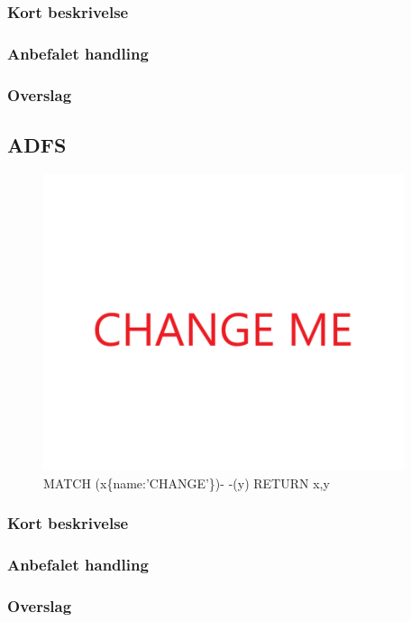 \documentclass{article}
\begin{document}
\subsubsection{Kort beskrivelse}
\subsubsection{Anbefalet handling}
\subsubsection{Overslag}


\subsection{ADFS}
\begin{figure}[h]
\includegraphics[width=300pt]{CHANGE.PNG}
\caption{MATCH (x\{name:'CHANGE'\})- -(y) RETURN x,y}
\end{figure}
\subsubsection{Kort beskrivelse}
\subsubsection{Anbefalet handling}
\subsubsection{Overslag}
\end{document}
